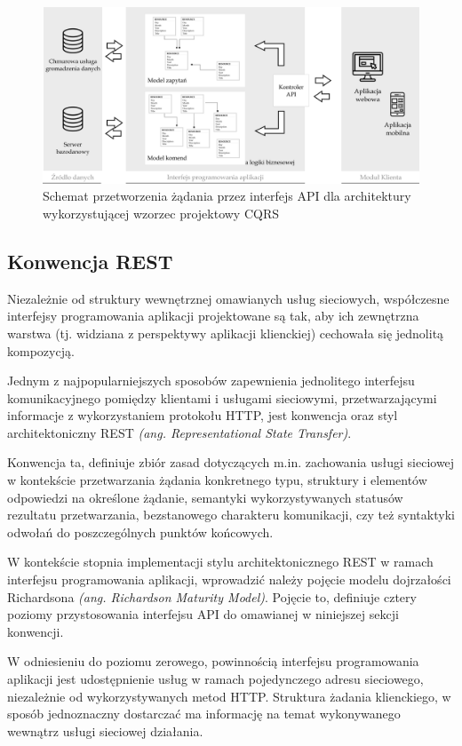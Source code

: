    \begin{figure}[ht]
    \centering
     \includegraphics[width=0.9\linewidth]{rys02/standard-vs-cqrs2.png}
    \caption{Schemat przetworzenia żądania przez interfejs API dla architektury wykorzystującej wzorzec projektowy CQRS}
    \label{fig:standard-vs-cqrs2}
   \end{figure}

\subsection*{Konwencja REST}
Niezależnie od struktury wewnętrznej omawianych usług sieciowych, współczesne interfejsy programowania aplikacji projektowane są tak, aby ich zewnętrzna warstwa (tj. widziana z perspektywy aplikacji klienckiej) cechowała się jednolitą kompozycją.

Jednym z najpopularniejszych sposobów zapewnienia jednolitego interfejsu komunikacyjnego pomiędzy klientami i usługami sieciowymi, przetwarzającymi informacje z wykorzystaniem protokołu HTTP, jest konwencja oraz styl architektoniczny REST \textit{(ang. Representational State Transfer)}.

Konwencja ta, definiuje zbiór zasad dotyczących m.in. zachowania usługi sieciowej w kontekście przetwarzania żądania konkretnego typu, struktury i elementów odpowiedzi na określone żądanie, semantyki wykorzystywanych statusów rezultatu przetwarzania, bezstanowego charakteru komunikacji, czy też syntaktyki odwołań do poszczególnych punktów końcowych.

W kontekście stopnia implementacji stylu architektonicznego REST w ramach interfejsu programowania aplikacji, wprowadzić należy pojęcie modelu dojrzałości Richardsona \textit{(ang. Richardson Maturity Model)}. Pojęcie to, definiuje cztery poziomy przystosowania interfejsu API do omawianej w niniejszej sekcji konwencji.

W odniesieniu do poziomu zerowego, powinnością interfejsu programowania aplikacji jest udostępnienie usług w ramach pojedynczego adresu sieciowego, niezależnie od wykorzystywanych metod HTTP. Struktura żadania klienckiego, w sposób jednoznaczny dostarczać ma informację na temat wykonywanego wewnątrz usługi sieciowej działania.


